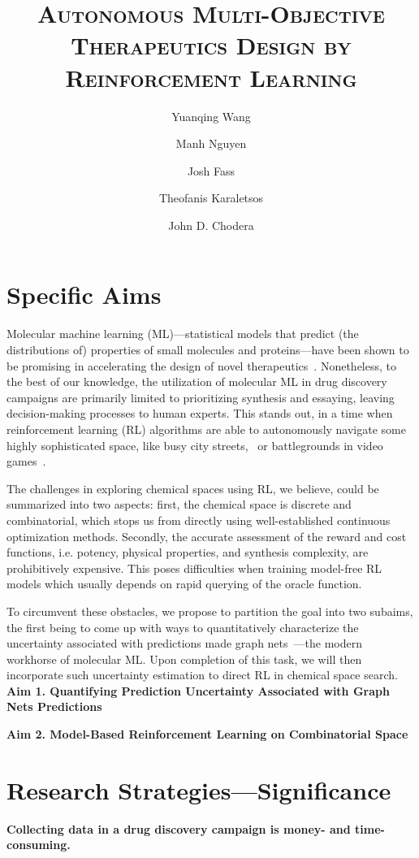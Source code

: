 \documentclass[11pt]{article}
\title{\textsc{Autonomous Multi-Objective Therapeutics Design by Reinforcement Learning}}
\author[1]{Yuanqing Wang}
\author[1, 2]{Manh Nguyen}
\author[1]{Josh Fass}
\author[3]{Theofanis Karaletsos}
\author[1]{John D. Chodera}
\affil[1]{Memorial Sloan Kettering Cancer Center, New York, N.Y. 10065}
\affil[2]{University of Pennsylvania, Philadelphia, Penn. 19104}
\affil[3]{Uber AI Labs, San Francisco, Calif. 94103}
\date{}
\begin{document}
\maketitle

\section{Specific Aims}
Molecular machine learning (ML)—statistical models that predict (the distributions of) properties of small molecules and proteins—have been shown to be promising in accelerating the design of novel therapeutics~\cite{wu2018moleculenet}. Nonetheless, to the best of our knowledge, the utilization of molecular ML in drug discovery campaigns are primarily limited to prioritizing synthesis and essaying, leaving decision-making processes to human experts. This stands out, in a time when reinforcement learning (RL) algorithms are able to autonomously navigate some highly sophisticated space, like busy city streets,~\cite{doi:10.1080/15472450.2017.1291351} or battlegrounds in video games~\cite{DBLP:journals/corr/abs-1710-03748}. 

The challenges in exploring chemical spaces using RL, we believe, could be summarized into two aspects: first, the chemical space is discrete and combinatorial, which stops us from directly using well-established continuous optimization methods. Secondly, the accurate assessment of the reward and cost functions, i.e. potency, physical properties, and synthesis complexity, are prohibitively expensive. This poses difficulties when training model-free RL models which usually depends on rapid querying of the oracle function.

To circumvent these obstacles, we propose to partition the goal into two subaims, the first being to come up with ways to quantitatively characterize the uncertainty associated with predictions made graph nets~\cite{battaglia2018relational}---the modern workhorse of molecular ML. Upon completion of this task, we will then incorporate such uncertainty estimation to direct RL in chemical space search.\\

\noindent\textbf{Aim 1. Quantifying Prediction Uncertainty Associated with Graph Nets Predictions}

\noindent\textbf{Aim 2. Model-Based Reinforcement Learning on Combinatorial Space}

\section{Research Strategies---Significance}
\noindent\textbf{Collecting data in a drug discovery campaign is money- and time-consuming.}
\end{document}
